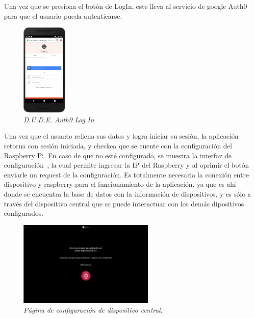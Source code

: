 Una vez que se presiona el botón de LogIn, este lleva al servicio de google Auth0 para que el usuario pueda autenticarse. ~


\begin{figure}[H]
  \centering
  \includegraphics[width=0.2\textwidth, keepaspectratio]{images/app-movil-auth0}
  \caption{\textit{D.U.D.E. Auth0 Log In}}
  \label{fig:app-movil-auth0}
\end{figure}

Una vez que el usuario rellena sus datos y logra iniciar su sesión, la aplicación retorna con sesión iniciada, y checkea que se cuente con la configuración del Raspberry Pi.
En caso de que no esté configurado, se muestra la interfaz de configuración~, la cual permite ingresar la IP del Raspberry y al oprimir el botón enviarle un request de la configuración. Es totalmente necesaria la conexión entre dispositivo y raspberry para el funcionamiento de la aplicación, ya que es ahí donde se encuentra la base de datos con la información de dispositivos, y es sólo a través del dispositivo central que se puede interactuar con los demás dipositivos configurados.

\begin{figure}[H]
  \centering
  \includegraphics[width=0.6\textwidth, keepaspectratio]{images/app-web-get-raspberry-configuration}
  \caption{\textit{Página de configuración de dispositivo central.}}
  \label{fig:app-web-get-raspberry-configuration}
\end{figure}

